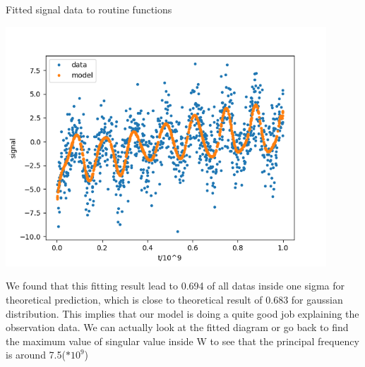 \documentclass[letterpaper,12pt]{article}
\begin{document}
\begin{table}[!h]
    \centering
    \caption{Fitted signal data to routine functions}
    \includegraphics[width=12cm]{ps5-3-55.png}
\end{table}%

We found that this fitting result lead to 0.694 of all datas inside one sigma for theoretical prediction, which is close to theoretical result of 0.683 for gaussian distribution. This implies that our model is doing a quite good job explaining the observation data. We can actually look at the fitted diagram or go back to find the maximum value of singular value inside W to see that the principal frequency is around 7.5($*10^9$)
  
\end{document}
